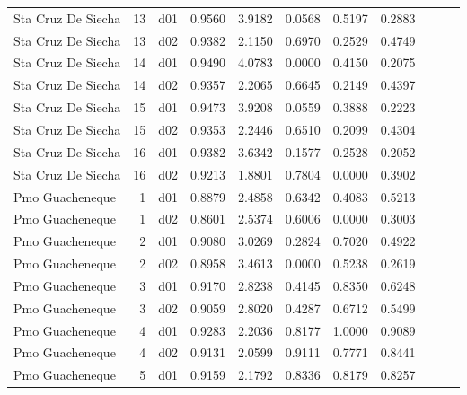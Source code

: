 \begin{landscape}
\begin{longtable}{p{2cm}rrrrrrrrrr}
   Sta Cruz De Siecha  &         13 &     d01 &   0.9560 &  3.9182 &        0.0568 &           0.5197 &  0.2883 \\
   Sta Cruz De Siecha  &         13 &     d02 &   0.9382 &  2.1150 &        0.6970 &           0.2529 &  0.4749 \\
   Sta Cruz De Siecha  &         14 &     d01 &   0.9490 &  4.0783 &        0.0000 &           0.4150 &  0.2075 \\
   Sta Cruz De Siecha  &         14 &     d02 &   0.9357 &  2.2065 &        0.6645 &           0.2149 &  0.4397 \\
   Sta Cruz De Siecha  &         15 &     d01 &   0.9473 &  3.9208 &        0.0559 &           0.3888 &  0.2223 \\
   Sta Cruz De Siecha  &         15 &     d02 &   0.9353 &  2.2446 &        0.6510 &           0.2099 &  0.4304 \\
   Sta Cruz De Siecha  &         16 &     d01 &   0.9382 &  3.6342 &        0.1577 &           0.2528 &  0.2052 \\
   Sta Cruz De Siecha  &         16 &     d02 &   0.9213 &  1.8801 &        0.7804 &           0.0000 &  0.3902 \\
      Pmo Guacheneque  &          1 &     d01 &   0.8879 &  2.4858 &        0.6342 &           0.4083 &  0.5213 \\
      Pmo Guacheneque  &          1 &     d02 &   0.8601 &  2.5374 &        0.6006 &           0.0000 &  0.3003 \\
      Pmo Guacheneque  &          2 &     d01 &   0.9080 &  3.0269 &        0.2824 &           0.7020 &  0.4922 \\
      Pmo Guacheneque  &          2 &     d02 &   0.8958 &  3.4613 &        0.0000 &           0.5238 &  0.2619 \\
      Pmo Guacheneque  &          3 &     d01 &   0.9170 &  2.8238 &        0.4145 &           0.8350 &  0.6248 \\
      Pmo Guacheneque  &          3 &     d02 &   0.9059 &  2.8020 &        0.4287 &           0.6712 &  0.5499 \\
      Pmo Guacheneque  &          4 &     d01 &   0.9283 &  2.2036 &        0.8177 &           1.0000 &  0.9089 \\
      Pmo Guacheneque  &          4 &     d02 &   0.9131 &  2.0599 &        0.9111 &           0.7771 &  0.8441 \\
      Pmo Guacheneque  &          5 &     d01 &   0.9159 &  2.1792 &        0.8336 &           0.8179 &  0.8257 \\

\end{longtable}
\end{landscape}
